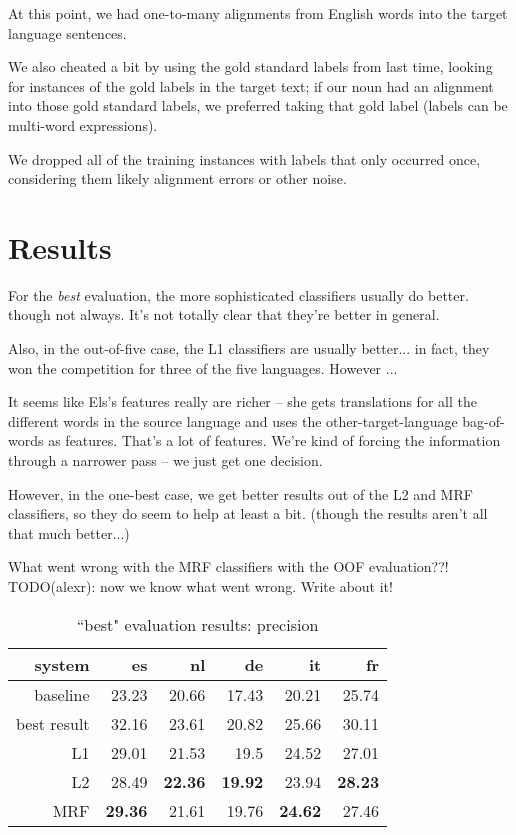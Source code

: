 \documentclass[11pt,letterpaper]{article}
\begin{document}
At this point, we had one-to-many alignments from English words into the target
language sentences.

We also cheated a bit by using the gold standard labels from last time, looking
for instances of the gold labels in the target text; if our noun had an
alignment into those gold standard labels, we preferred taking that gold label
(labels can be multi-word expressions).

We dropped all of the training instances with labels that only occurred once,
considering them likely alignment errors or other noise.

\section{Results}
For the \emph{best} evaluation, the more sophisticated classifiers usually do
better. though not always. It's not totally clear that they're better in
general.

Also, in the out-of-five case, the L1 classifiers are usually better... in
fact, they won the competition for three of the five languages.
However ...

It seems like Els's features really are richer -- she gets translations for all
the different words in the source language and uses the other-target-language
bag-of-words as features. That's a lot of features. We're kind of forcing the
information through a narrower pass -- we just get one decision.

However, in the one-best case, we get better results out of the L2 and MRF
classifiers, so they do seem to help at least a bit. (though the results aren't
all that much better...)

What went wrong with the MRF classifiers with the OOF evaluation??!
TODO(alexr): now we know what went wrong. Write about it!

\begin{table*}[t!]
  \begin{center}
    \begin{tabular}{|r|r|r|r|r|r|}
      \hline
      system   & es    & nl    & de    &  it   & fr \\
      \hline
      baseline & 23.23          & 20.66          & 17.43          & 20.21          & 25.74 \\
   best result & 32.16          & 23.61          & 20.82          & 25.66          & 30.11 \\
            L1 & 29.01          & 21.53          & 19.5           & 24.52          & 27.01 \\
            L2 & 28.49          & \textbf{22.36} & \textbf{19.92} & 23.94          & \textbf{28.23} \\
           MRF & \textbf{29.36} & 21.61          & 19.76          & \textbf{24.62} & 27.46 \\
      \hline
    \end{tabular}
  \caption{``best" evaluation results: precision}
  \label{table:resultsbest}
  \end{center}
\end{table*}
\end{document}
